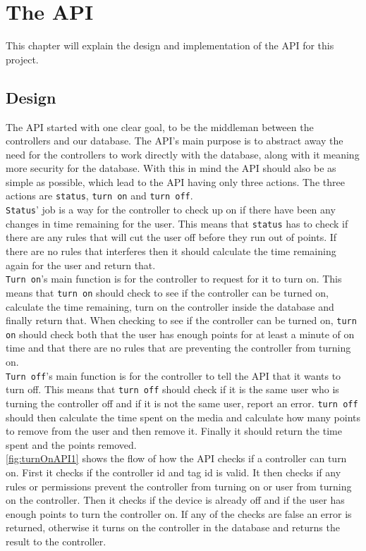 \chapter{The API}
\label{chap:api}
This chapter will explain the design and implementation of the API for this project.
\section{Design}
The API started with one clear goal, to be the middleman between the controllers and our database. The API's main purpose is to abstract away the need for the controllers to work directly with the database, along with it meaning more security for the database. With this in mind the API should also be as simple as possible, which lead to the API having only three actions. The three actions are \texttt{status}, \texttt{turn on} and \texttt{turn off}. \\
\texttt{Status}' job is a way for the controller to check up on if there have been any changes in time remaining for the user. This means that \texttt{status} has to check if there are any rules that will cut the user off before they run out of points. If there are no rules that interferes then it should calculate the time remaining again for the user and return that. \\
\texttt{Turn on}'s main function is for the controller to request for it to turn on. This means that \texttt{turn on} should check to see if the controller can be turned on, calculate the time remaining, turn on the controller inside the database and finally return that. When checking to see if the controller can be turned on, \texttt{turn on} should check both that the user has enough points for at least a minute of on time and that there are no rules that are preventing the controller from turning on.\\
\texttt{Turn off}'s main function is for the controller to tell the API that it wants to turn off. This means that \texttt{turn off} should check if it is the same user who is turning the controller off and if it is not the same user, report an error. \texttt{turn off} should then calculate the time spent on the media and calculate how many points to remove from the user and then remove it. Finally it should return the time spent and the points removed. \\
\autoref{fig:turnOnAPI1} shows the flow of how the API checks if a controller can turn on. First it checks if the controller id and tag id is valid. It then checks if any rules or permissions prevent the controller from turning on or user from turning on the controller. Then it checks if the device is already off and if the user has enough points to turn the controller on. If any of the checks are false an error is returned, otherwise it turns on the controller in the database and returns the result to the controller.

